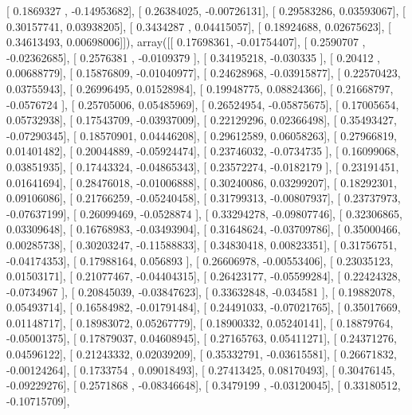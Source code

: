 \documentclass{article}
\begin{document}
       [ 0.1869327 , -0.14953682],
       [ 0.26384025, -0.00726131],
       [ 0.29583286,  0.03593067],
       [ 0.30157741,  0.03938205],
       [ 0.3434287 ,  0.04415057],
       [ 0.18924688,  0.02675623],
       [ 0.34613493,  0.00698006]]), array([[ 0.17698361, -0.01754407],
       [ 0.2590707 , -0.02362685],
       [ 0.2576381 , -0.0109379 ],
       [ 0.34195218, -0.030335  ],
       [ 0.20412   ,  0.00688779],
       [ 0.15876809, -0.01040977],
       [ 0.24628968, -0.03915877],
       [ 0.22570423,  0.03755943],
       [ 0.26996495,  0.01528984],
       [ 0.19948775,  0.08824366],
       [ 0.21668797, -0.0576724 ],
       [ 0.25705006,  0.05485969],
       [ 0.26524954, -0.05875675],
       [ 0.17005654,  0.05732938],
       [ 0.17543709, -0.03937009],
       [ 0.22129296,  0.02366498],
       [ 0.35493427, -0.07290345],
       [ 0.18570901,  0.04446208],
       [ 0.29612589,  0.06058263],
       [ 0.27966819,  0.01401482],
       [ 0.20044889, -0.05924474],
       [ 0.23746032, -0.0734735 ],
       [ 0.16099068,  0.03851935],
       [ 0.17443324, -0.04865343],
       [ 0.23572274, -0.0182179 ],
       [ 0.23191451,  0.01641694],
       [ 0.28476018, -0.01006888],
       [ 0.30240086,  0.03299207],
       [ 0.18292301,  0.09106086],
       [ 0.21766259, -0.05240458],
       [ 0.31799313, -0.00807937],
       [ 0.23737973, -0.07637199],
       [ 0.26099469, -0.0528874 ],
       [ 0.33294278, -0.09807746],
       [ 0.32306865,  0.03309648],
       [ 0.16768983, -0.03493904],
       [ 0.31648624, -0.03709786],
       [ 0.35000466,  0.00285738],
       [ 0.30203247, -0.11588833],
       [ 0.34830418,  0.00823351],
       [ 0.31756751, -0.04174353],
       [ 0.17988164,  0.056893  ],
       [ 0.26606978, -0.00553406],
       [ 0.23035123,  0.01503171],
       [ 0.21077467, -0.04404315],
       [ 0.26423177, -0.05599284],
       [ 0.22424328, -0.0734967 ],
       [ 0.20845039, -0.03847623],
       [ 0.33632848, -0.034581  ],
       [ 0.19882078,  0.05493714],
       [ 0.16584982, -0.01791484],
       [ 0.24491033, -0.07021765],
       [ 0.35017669,  0.01148717],
       [ 0.18983072,  0.05267779],
       [ 0.18900332,  0.05240141],
       [ 0.18879764, -0.05001375],
       [ 0.17879037,  0.04608945],
       [ 0.27165763,  0.05411271],
       [ 0.24371276,  0.04596122],
       [ 0.21243332,  0.02039209],
       [ 0.35332791, -0.03615581],
       [ 0.26671832, -0.00124264],
       [ 0.1733754 ,  0.09018493],
       [ 0.27413425,  0.08170493],
       [ 0.30476145, -0.09229276],
       [ 0.2571868 , -0.08346648],
       [ 0.3479199 , -0.03120045],
       [ 0.33180512, -0.10715709],
\end{document}
